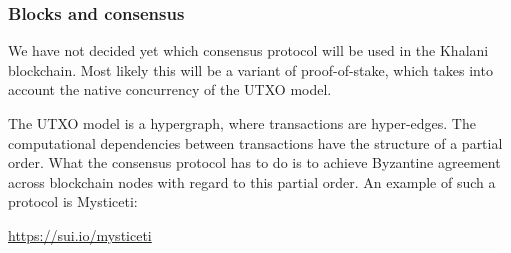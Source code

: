 \documentclass[a4paper]{article}
\begin{document}
\subsubsection{Blocks and consensus}

We have not decided yet which consensus protocol will be used in the Khalani blockchain. Most likely this will be a variant of proof-of-stake, which takes into account the native concurrency of the UTXO model.

The UTXO model is a hypergraph, where transactions are hyper-edges. The computational dependencies between transactions have the structure of a partial order. What the consensus protocol has to do is to achieve Byzantine agreement across blockchain nodes with regard to this partial order. An example of such a protocol is Mysticeti:

\href{https://sui.io/mysticeti}{https://sui.io/mysticeti}

\newpage

\begin{appendices}

\makeatletter
\renewcommand{\@seccntformat}[1]{%
  \@ifundefined{#1name}{}{\csname #1name\endcsname~}%
  \csname the#1\endcsname: }
\makeatother



\newpage



\newpage



\end{appendices}
\end{document}
